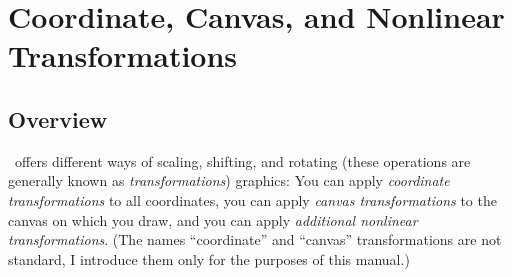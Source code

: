 %
%
%


\section{Coordinate, Canvas, and Nonlinear Transformations}

\subsection{Overview}

\pgfname\ offers different ways of scaling, shifting, and rotating (these
operations are generally known as \emph{transformations}) graphics: You can
apply \emph{coordinate transformations} to all coordinates, you can apply
\emph{canvas transformations} to the canvas on which you draw, and you can
apply \emph{additional nonlinear transformations}. (The names ``coordinate''
and ``canvas'' transformations are not standard, I introduce them only for the
purposes of this manual.)


